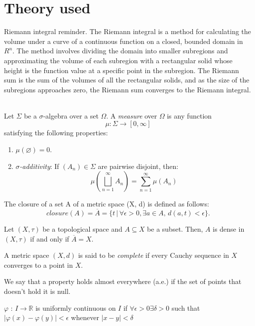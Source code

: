 \documentclass[../main.tex]{subfiles}
\begin{document}
\appendix

\chapter{ Theory used} \label{apx:purification_with_noise}

\begin{definition} Riemann integral reminder. 
The Riemann integral is a method for calculating the volume under a curve of a continuous function on a closed, bounded domain in $R^n$. The method involves dividing the domain into smaller subregions and approximating the volume of each subregion with a rectangular solid whose height is the function value at a specific point in the subregion. The Riemann sum is the sum of the volumes of all the rectangular solids, and as the size of the subregions approaches zero, the Riemann sum converges to the Riemann integral. \\ \\
\end{definition}

\begin{definition}
	Let $\Sigma$ be a $\sigma$-algebra over a set $\Omega$. A \emph{measure} over $\Omega$ is any function $$\mu:\Sigma\longrightarrow[0,\infty]$$ satisfying the following properties:
	\begin{enumerate}
		\item $\mu(\varnothing)=0$.
		\item\label{RFA:sigmaadditivity} \emph{$\sigma$-additivity}: If $(A_n)\in\Sigma$ are pairwise disjoint, then: $$\mu\left(\bigsqcup_{n=1}^\infty A_n\right)=\sum_{n=1}^\infty \mu(A_n)$$
	\end{enumerate}
\end{definition}

\begin{definition}The closure of a set A of a metric space (X, d) is defined as follows:
	$$closure(A) = \overline{A}=\{t \, |  \, \forall \epsilon> 0, \exists a \in A, \, d(a, t) < \epsilon\}.$$
\end{definition}

\begin{propo}
 Let $(X,\tau)$ be a topological space and $A\subseteq X$ be a subset. Then, $A$ is dense in $(X,\tau)$ if and only if $\overline{A}=X$.
\end{propo}

\begin{definition} A metric space $(X,d)$ is said to be \emph{complete} if every Cauchy sequence in $X$ converges to a point in $X$. 
\end{definition}

\begin{definition}
We say that a property holds almost everywhere (a.e.) if the set of points that doesn’t hold it is null.
\end{definition}


\begin{definition} 
	$\varphi$ : $I \rightarrow \mathbb{R}$ is uniformly continuous on $I$ if $\forall \epsilon > 0 \exists \delta >0 $ such that $|\varphi(x)- \varphi(y)| < \epsilon$ whenever $|x-y|< \delta$
\end{definition}
\end{document}
